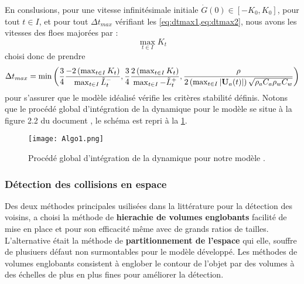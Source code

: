 En conslusions, pour une vitesse infinitésimale initiale $\dot{G}(0) \in [-K_0, K_0]$, pour tout $t \in I$, et pour tout $\Delta t_{max}$ vérifiant les \cref{eq:dtmax1,eq:dtmax2}, nous avons les vitesses des floes majorées par :
$$
\max_{t \in I}{K_t}
$$
\citeauthor{rabatel2015thesis} choisi donc de prendre 
$$
\Delta t_{max} = \min{ \left( \frac{3}{4} \frac{ -2 \left( \max_{t \in I}{K_t} \right)}{ \max_{t \in I}{\tilde{L}_t^{-}}}, \frac{3}{4} \frac{2 \left( \max_{t \in I}{K_t} \right) }{ \max_{t \in I}{-\tilde{L}_t^{+}}}, \frac{\rho}{2 \left(  \max_{t \in I}{  \vert \bm{\mathrm{U}}_a(t) \vert } \right)  \sqrt{\rho_a C_a \rho_w C_w}} \right)}
$$
pour s'assurer que le modèle idéalisé vérifie les critères stabilité définis. 
Notons que le procédé global d’intégration de la dynamique pour le modèle se situe à la figure 2.2 du document \parencite[p.60]{rabatel2015thesis}, le schéma est repri à la \cref{fig:Algo1}.

\begin{figure}[!h]
    \centering
    \texttt{[image: Algo1.png]}
    \caption{Procédé global d’intégration de la dynamique pour notre modèle \parencite[p.60]{rabatel2015thesis}.}
    \label{fig:Algo1}
\end{figure}


\subsubsection{Détection des collisions en espace}

Des deux méthodes principales usilisées dans la littérature pour la détection des voisins, \citeauthor{rabatel2015thesis} a choisi la méthode de \textbf{hierachie de volumes englobants} facilité de mise en place et pour son efficacité même avec de grands ratios de tailles. L'alternative était la méthode de \textbf{partitionnement de l'espace} qui elle, souffre de plusiuers défaut non surmontables pour le modèle développé. Les méthodes de volumes englobants consistent à englober le contour de l’objet par des volumes à des échelles de plus en plus fines pour améliorer la détection.

